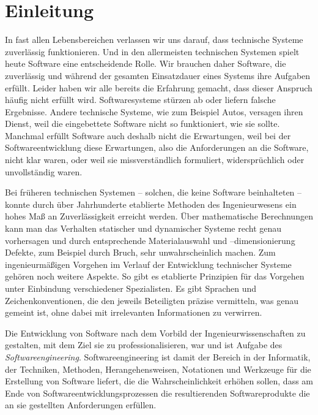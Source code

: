 \cleardoublepage
\chapter*{Einleitung}
\label{sec:Kap-0.3}

\vspace{3cm} %
\vspace{\baselineskip} %


In fast allen Lebensbereichen verlassen wir uns darauf, dass technische Systeme zuverlässig funktionieren. Und in den allermeisten technischen Systemen spielt heute Software eine entscheidende Rolle. Wir brauchen daher Software, die zuverlässig und während der gesamten Einsatzdauer eines Systems ihre Aufgaben erfüllt. Leider haben wir alle bereits die Erfahrung gemacht, dass dieser Anspruch häufig nicht erfüllt wird. Softwaresysteme stürzen ab oder liefern falsche Ergebnisse. Andere technische Systeme, wie zum Beispiel Autos, versagen ihren Dienst, weil die eingebettete Software nicht so funktioniert, wie sie sollte. Manchmal erfüllt Software auch deshalb nicht die Erwartungen, weil bei der Softwareentwicklung diese Erwartungen, also die Anforderungen an die Software, nicht klar waren, oder weil sie missverständlich formuliert, widersprüchlich oder unvollständig waren. 

Bei früheren technischen Systemen – solchen, die keine Software beinhalteten – konnte durch über Jahrhunderte etablierte Methoden des Ingenieurwesens ein hohes Maß an Zuverlässigkeit erreicht werden.
Über mathematische Berechnungen kann man das Verhalten statischer und dynamischer Systeme recht genau vorhersagen und durch entsprechende Materialauswahl und –dimensionierung Defekte, zum Beispiel durch Bruch, sehr unwahrscheinlich machen. Zum ingenieurmäßigen Vorgehen im Verlauf der Entwicklung technischer Systeme gehören noch weitere Aspekte. So gibt es etablierte Prinzipien für das Vorgehen unter Einbindung verschiedener Spezialisten. Es gibt Sprachen und Zeichenkonventionen, die den jeweils Beteiligten präzise vermitteln, was genau gemeint ist, ohne dabei mit irrelevanten Informationen zu verwirren. 

Die Entwicklung von Software nach dem Vorbild der Ingenieurwissenschaften zu gestalten, mit dem Ziel sie zu professionalisieren, war und 
ist Aufgabe des \textit{Software\-engineering}. Softwareengineering ist damit der Bereich in der Informatik, der Techniken, Methoden, Herangehensweisen, Notationen und Werkzeuge für die \mbox{Erstellung} von Software liefert, die die Wahrscheinlichkeit erhöhen sollen, dass am Ende von Softwareentwicklungsprozessen die resultierenden Softwareprodukte die an sie gestellten Anforderungen erfüllen.

